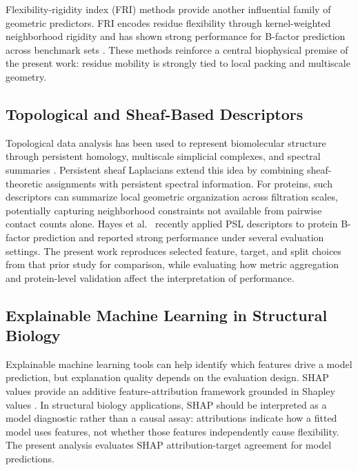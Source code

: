 \documentclass[11pt]{article}
\begin{document}
Flexibility-rigidity index (FRI) methods provide another influential family of geometric predictors. FRI encodes residue flexibility through kernel-weighted neighborhood rigidity and has shown strong performance for B-factor prediction across benchmark sets \citep{nguyen2016}. These methods reinforce a central biophysical premise of the present work: residue mobility is strongly tied to local packing and multiscale geometry.

\subsection{Topological and Sheaf-Based Descriptors}
Topological data analysis has been used to represent biomolecular structure through persistent homology, multiscale simplicial complexes, and spectral summaries \citep{edelsbrunner2010, xia2014}. Persistent sheaf Laplacians extend this idea by combining sheaf-theoretic assignments with persistent spectral information. For proteins, such descriptors can summarize local geometric organization across filtration scales, potentially capturing neighborhood constraints not available from pairwise contact counts alone. Hayes et al.~\citep{hayes2025, hayes2025correction} recently applied PSL descriptors to protein B-factor prediction and reported strong performance under several evaluation settings. The present work reproduces selected feature, target, and split choices from that prior study for comparison, while evaluating how metric aggregation and protein-level validation affect the interpretation of performance.

\subsection{Explainable Machine Learning in Structural Biology}
Explainable machine learning tools can help identify which features drive a model prediction, but explanation quality depends on the evaluation design. SHAP values provide an additive feature-attribution framework grounded in Shapley values \citep{lundberg2017}. In structural biology applications, SHAP should be interpreted as a model diagnostic rather than a causal assay: attributions indicate how a fitted model uses features, not whether those features independently cause flexibility. The present analysis evaluates SHAP attribution-target agreement for model predictions.
\end{document}
